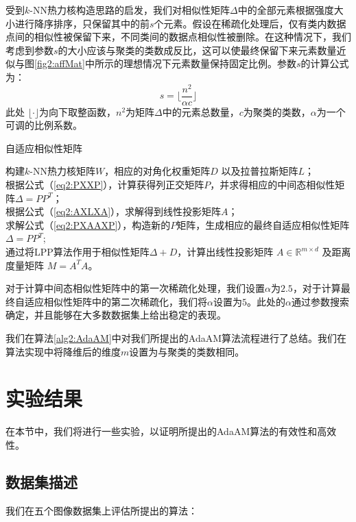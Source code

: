 受到$k$-NN热力核构造思路的启发，我们对相似性矩阵$\Delta$中的全部元素根据强度大小进行降序排序，只保留其中的前$s$个元素。假设在稀疏化处理后，仅有类内数据点间的相似性被保留下来，不同类间的数据点相似性被删除。在这种情况下，我们考虑到参数$s$的大小应该与聚类的类数成反比，这可以使最终保留下来元素数量近似与图\ref{fig2:affMat}中所示的理想情况下元素数量保持固定比例。参数$s$的计算公式为：
\begin{equation}
	s = \lfloor \frac{n^2}{\alpha c}\rfloor
\end{equation}
此处 $\lfloor \cdot\rfloor$为向下取整函数，$n^2$为矩阵$\Delta$中的元素总数量，$c$为聚类的类数，$\alpha$为一个可调的比例系数。

\begin{algorithm}[t]
	\caption{自适应相似性矩阵}
	\label{alg2:AdaAM}
	构建$k$-NN热力核矩阵$W$，相应的对角化权重矩阵$D$ 以及拉普拉斯矩阵$L$；\\
	根据公式（\ref{eq2:PXXP}），计算获得列正交矩阵$P$，并求得相应的中间态相似性矩阵$\Delta = PP^T$；\\
	根据公式（\ref{eq2:AXLXA}），求解得到线性投影矩阵$A$；\\
	求解公式（\ref{eq2:PXAAXP}），构造新的$P$矩阵，生成相应的最终自适应相似性矩阵$\Delta = PP^T$;\\
	通过将LPP算法作用于相似性矩阵$\Delta + D$，计算出线性投影矩阵 $A\in\mathbb{R}^{m\times d}$ 及距离度量矩阵 $M=A^TA$。
\end{algorithm}

对于计算中间态相似性矩阵中的第一次稀疏化处理，我们设置$\alpha$为$2.5$，对于计算最终自适应相似性矩阵中的第二次稀疏化，我们将$\alpha$设置为$5$。此处的$\alpha$通过参数搜索确定，并且能够在大多数数据集上给出稳定的表现。

我们在算法\ref{alg2:AdaAM}中对我们所提出的AdaAM算法流程进行了总结。我们在算法实现中将降维后的维度$m$设置为与聚类的类数相同。


\section{实验结果}
\label{sec2:Exp}
在本节中，我们将进行一些实验，以证明所提出的AdaAM算法的有效性和高效性。
\subsection{数据集描述}
我们在五个图像数据集上评估所提出的算法：


